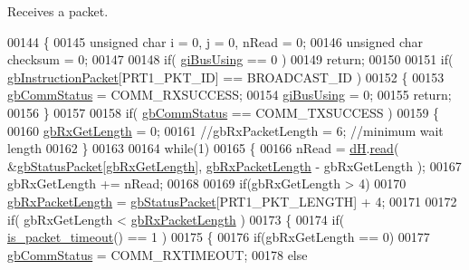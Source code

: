 Receives a packet. 


\begin{DoxyCode}
00144 \{
00145     \textcolor{keywordtype}{unsigned} \textcolor{keywordtype}{char} i = 0, j = 0, nRead = 0;
00146     \textcolor{keywordtype}{unsigned} \textcolor{keywordtype}{char} checksum = 0;
00147 
00148     \textcolor{keywordflow}{if}( \hyperlink{classdynamixel_ad10e0e49f5fef04bf789a89c14cc470a}{giBusUsing} == 0 )
00149         \textcolor{keywordflow}{return};
00150 
00151     \textcolor{keywordflow}{if}( \hyperlink{classdynamixel_afd94dcf01b8e96298727776e222de722}{gbInstructionPacket}[PRT1\_PKT\_ID] == BROADCAST\_ID )
00152     \{
00153         \hyperlink{classdynamixel_a5b603f6bed7ccc595f1f50bd6a6ebbfc}{gbCommStatus} = COMM\_RXSUCCESS;
00154         \hyperlink{classdynamixel_ad10e0e49f5fef04bf789a89c14cc470a}{giBusUsing} = 0;
00155         \textcolor{keywordflow}{return};
00156     \}
00157     
00158     \textcolor{keywordflow}{if}( \hyperlink{classdynamixel_a5b603f6bed7ccc595f1f50bd6a6ebbfc}{gbCommStatus} == COMM\_TXSUCCESS )
00159     \{
00160         \hyperlink{classdynamixel_a9d590ce24791d111c2db9b66be1e046d}{gbRxGetLength} = 0;
00161         \textcolor{comment}{//gbRxPacketLength = 6; //minimum wait length}
00162     \}
00163     
00164     \textcolor{keywordflow}{while}(1)
00165     \{
00166         nRead = \hyperlink{classdynamixel_ae003cc90ada6d7b70eaa4ea9d42d4deb}{dH}.\hyperlink{classdxl__hal_ac36331febb2eaa66303af3483795742a}{read}( &\hyperlink{classdynamixel_aa57c86d3bbbeaf5c9d4f6bd00376b04f}{gbStatusPacket}[\hyperlink{classdynamixel_a9d590ce24791d111c2db9b66be1e046d}{gbRxGetLength}], 
      \hyperlink{classdynamixel_a333686e1b5903d16c41df8172b6bd5a8}{gbRxPacketLength} - gbRxGetLength );
00167         gbRxGetLength += nRead;
00168 
00169         \textcolor{keywordflow}{if}(gbRxGetLength > 4)
00170             \hyperlink{classdynamixel_a333686e1b5903d16c41df8172b6bd5a8}{gbRxPacketLength} = \hyperlink{classdynamixel_aa57c86d3bbbeaf5c9d4f6bd00376b04f}{gbStatusPacket}[PRT1\_PKT\_LENGTH] + 4;
00171 
00172         \textcolor{keywordflow}{if}( gbRxGetLength < \hyperlink{classdynamixel_a333686e1b5903d16c41df8172b6bd5a8}{gbRxPacketLength} )
00173         \{
00174             \textcolor{keywordflow}{if}( \hyperlink{classdynamixel_a00d08481ebc4dee19debecf43f888522}{is\_packet\_timeout}() == 1 )
00175             \{
00176                 \textcolor{keywordflow}{if}(gbRxGetLength == 0)
00177                     \hyperlink{classdynamixel_a5b603f6bed7ccc595f1f50bd6a6ebbfc}{gbCommStatus} = COMM\_RXTIMEOUT;
00178                 \textcolor{keywordflow}{else}

\end{DoxyCode}
